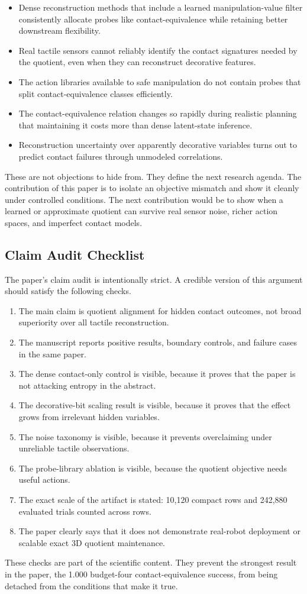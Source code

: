\documentclass{article}
\begin{document}
\begin{itemize}
    \item Dense reconstruction methods that include a learned manipulation-value filter consistently allocate probes like contact-equivalence while retaining better downstream flexibility.
    \item Real tactile sensors cannot reliably identify the contact signatures needed by the quotient, even when they can reconstruct decorative features.
    \item The action libraries available to safe manipulation do not contain probes that split contact-equivalence classes efficiently.
    \item The contact-equivalence relation changes so rapidly during realistic planning that maintaining it costs more than dense latent-state inference.
    \item Reconstruction uncertainty over apparently decorative variables turns out to predict contact failures through unmodeled correlations.
\end{itemize}

These are not objections to hide from. They define the next research agenda. The contribution of this paper is to isolate an objective mismatch and show it cleanly under controlled conditions. The next contribution would be to show when a learned or approximate quotient can survive real sensor noise, richer action spaces, and imperfect contact models.

\subsection{Claim Audit Checklist}

The paper's claim audit is intentionally strict. A credible version of this argument should satisfy the following checks.

\begin{enumerate}
    \item The main claim is quotient alignment for hidden contact outcomes, not broad superiority over all tactile reconstruction.
    \item The manuscript reports positive results, boundary controls, and failure cases in the same paper.
    \item The dense contact-only control is visible, because it proves that the paper is not attacking entropy in the abstract.
    \item The decorative-bit scaling result is visible, because it proves that the effect grows from irrelevant hidden variables.
    \item The noise taxonomy is visible, because it prevents overclaiming under unreliable tactile observations.
    \item The probe-library ablation is visible, because the quotient objective needs useful actions.
    \item The exact scale of the artifact is stated: 10,120 compact rows and 242,880 evaluated trials counted across rows.
    \item The paper clearly says that it does not demonstrate real-robot deployment or scalable exact 3D quotient maintenance.
\end{enumerate}

These checks are part of the scientific content. They prevent the strongest result in the paper, the 1.000 budget-four contact-equivalence success, from being detached from the conditions that make it true.
\end{document}
